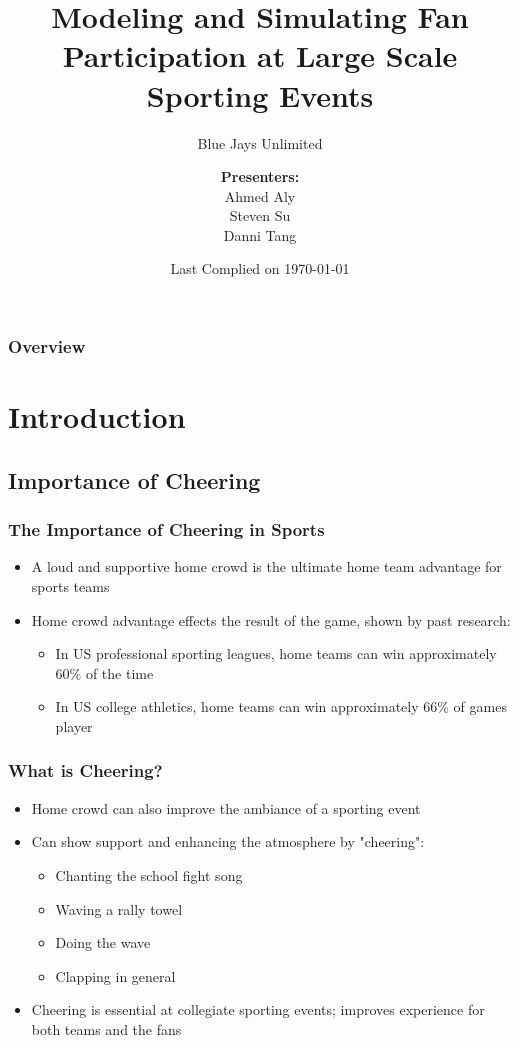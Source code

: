\documentclass[compress,handout,10pt]{beamer}
\title{{\LARGE Modeling and Simulating Fan Participation at Large Scale Sporting Events\newline} }
\subtitle{{\large Blue Jays Unlimited} }
\author{ 
    {\bf{Presenters:}}\\ 
Ahmed Aly\\
Steven Su \\
Danni Tang\\ 
    \vspace{5pt}
}
\institute{JHU AMS 550.400 Fall 2012}
\date{Last Complied on \today}
\let\olditem\item
\renewcommand{\item}{\setlength{\itemsep}{0.5\baselineskip}\olditem}
\begin{document}
\begin{frame}[plain]
	\titlepage
\end{frame}

\begin{frame} [allowframebreaks]
	\frametitle{Overview}
{\small \tableofcontents}
\end{frame}

\section{Introduction}

\subsection{Importance of Cheering}

\begin{frame}
	\frametitle{The Importance of Cheering in Sports}
		\begin {itemize}
			\item A loud and supportive home crowd is the ultimate home team advantage for sports teams
			\item Home crowd advantage effects the result of the game, shown by past research:
			\begin{itemize}
				\item In US professional sporting leagues, home teams can win approximately 60\% of the time \cite{Jamieson_2010}
				\item In US college athletics, home teams can win approximately 66\% of games player \cite{Snyder_1985}
			\end{itemize}
		\end {itemize}
\end{frame}

\begin{frame}
	\frametitle{What is Cheering?}
		\begin{itemize}
		\item Home crowd can also improve the ambiance of a sporting event
		\item Can show support and enhancing the atmosphere by "cheering":
		\begin{itemize}
			\item Chanting the school fight song
			\item Waving a rally towel
			\item Doing the wave
			\item Clapping in general
		\end{itemize}
	\item Cheering is essential at collegiate sporting events; improves experience for both teams and the fans
	\end{itemize}
\end{frame}
\end{document}
